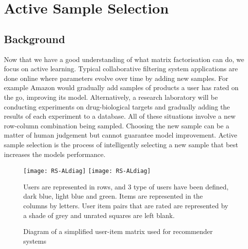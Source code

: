 \chapter{Active Sample Selection}
\ifpdf
    \graphicspath{{Chapter2/Chapter2Figs/PNG/}{Chapter2/Chapter2Figs/PDF/}{Chapter2/Chapter2Figs/}}
\else
    \graphicspath{{Chapter2/Chapter2Figs/EPS/}{Chapter2/Chapter2Figs/}}
\fi
{}
\section{Background}

Now that we have a good understanding of what matrix factorisation can do, we focus on active learning. Typical collaborative filtering system applications are done online where parameters evolve over time by adding new samples. For example Amazon would gradually add samples of products a user has rated on the go, improving its model. Alternatively, a research laboratory will be conducting experiments on drug-biological targets and gradually adding the results of each experiment to a database. All of these situations involve a new row-column combination being sampled. Choosing the new sample can be a matter of human judgement but cannot guarantee model improvement. Active sample selection is the process of intelligently selecting a new sample that best increases the models performance.

\begin{figure}[H]
  \begin{center}
    \leavevmode
    \ifpdf
      \texttt{[image: RS-ALdiag]}
    \else
      \texttt{[image: RS-ALdiag]}
    \fi
    \end{center}
Users are represented in rows, and 3 type of users have been defined, dark blue, light blue and green. Items are represented in the columns by letters. User item pairs that are rated are represented by a shade of grey and unrated squares are left blank.
    \caption{Diagram of a simplified user-item matrix used for recommender systems}
    \label{fig:al-diag}
\end{figure}

